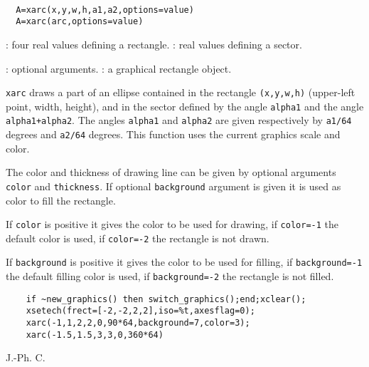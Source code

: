 \begin{mandesc}
   \\ %
\end{mandesc}
\begin{calling_sequence}
\begin{verbatim}
  A=xarc(x,y,w,h,a1,a2,options=value)
  A=xarc(arc,options=value)
\end{verbatim}
\end{calling_sequence}
\begin{parameters}
  \begin{varlist}
    : four real values defining a rectangle.
    : real values defining a sector.
    
    : optional arguments.
    : a graphical rectangle object.
  \end{varlist}
\end{parameters}

\begin{mandescription}
  \verb!xarc! draws a part of an ellipse contained in the rectangle 
  \verb!(x,y,w,h)! (upper-left point, width, height), and in the sector 
  defined by the angle \verb!alpha1! and the angle \verb!alpha1+alpha2!. 
  The angles \verb!alpha1! and \verb!alpha2! are 
  given respectively by \verb!a1/64! degrees and \verb!a2/64! degrees.
  This function uses the current graphics scale and color.

  The color and thickness of drawing line can be given by optional arguments
  \verb!color! and \verb!thickness!. If optional \verb!background!
  argument is given it is used as color to fill the rectangle.

  If \verb!color! is positive it gives the color to be used for drawing,
  if \verb!color=-1! the default color is used, if  \verb!color=-2! the
  rectangle is not drawn.

  If \verb!background! is positive it gives the color to be used for filling,
  if \verb!background=-1! the default filling color is used,
  if  \verb!background=-2! the rectangle is not filled.
\end{mandescription}

\begin{examples}
  \begin{Verbatim}
    if ~new_graphics() then switch_graphics();end;xclear();
    xsetech(frect=[-2,-2,2,2],iso=%t,axesflag=0);
    xarc(-1,1,2,2,0,90*64,background=7,color=3);
    xarc(-1.5,1.5,3,3,0,360*64)
  \end{Verbatim}
\end{examples}
\begin{manseealso}
     
\end{manseealso}
\begin{authors}
  J.-Ph. C.  
\end{authors}

